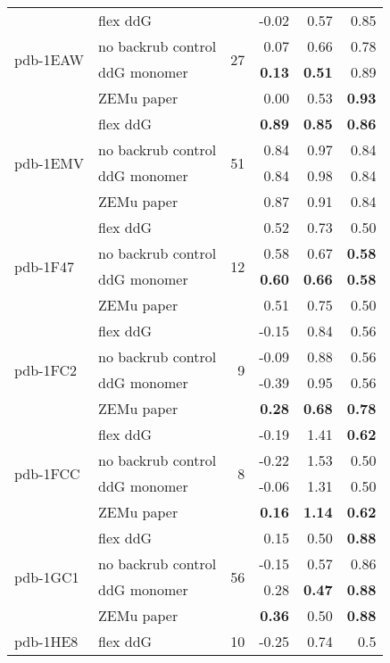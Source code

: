 \begin{longtable}{llrrrr}
 \multirow{ 4}{*}{pdb-1EAW} & flex ddG & \multirow{ 4}{*}{27} & -0.02 & 0.57 & 0.85  \\
 & no backrub control & & 0.07 & 0.66 & 0.78  \\
 & ddG monomer & & \textbf{0.13} & \textbf{0.51} & 0.89  \\
 & ZEMu paper & & 0.00 & 0.53 & \textbf{0.93}  \\
\hline
 \multirow{ 4}{*}{pdb-1EMV} & flex ddG & \multirow{ 4}{*}{51} & \textbf{0.89} & \textbf{0.85} & \textbf{0.86}  \\
 & no backrub control & & 0.84 & 0.97 & 0.84  \\
 & ddG monomer & & 0.84 & 0.98 & 0.84  \\
 & ZEMu paper & & 0.87 & 0.91 & 0.84  \\
\hline
 \multirow{ 4}{*}{pdb-1F47} & flex ddG & \multirow{ 4}{*}{12} & 0.52 & 0.73 & 0.50  \\
 & no backrub control & & 0.58 & 0.67 & \textbf{0.58}  \\
 & ddG monomer & & \textbf{0.60} & \textbf{0.66} & \textbf{0.58}  \\
 & ZEMu paper & & 0.51 & 0.75 & 0.50  \\
\hline
 \multirow{ 4}{*}{pdb-1FC2} & flex ddG & \multirow{ 4}{*}{9} & -0.15 & 0.84 & 0.56  \\
 & no backrub control & & -0.09 & 0.88 & 0.56  \\
 & ddG monomer & & -0.39 & 0.95 & 0.56  \\
 & ZEMu paper & & \textbf{0.28} & \textbf{0.68} & \textbf{0.78}  \\
\hline
 \multirow{ 4}{*}{pdb-1FCC} & flex ddG & \multirow{ 4}{*}{8} & -0.19 & 1.41 & \textbf{0.62}  \\
 & no backrub control & & -0.22 & 1.53 & 0.50  \\
 & ddG monomer & & -0.06 & 1.31 & 0.50  \\
 & ZEMu paper & & \textbf{0.16} & \textbf{1.14} & \textbf{0.62}  \\
\hline
 \multirow{ 4}{*}{pdb-1GC1} & flex ddG & \multirow{ 4}{*}{56} & 0.15 & 0.50 & \textbf{0.88}  \\
 & no backrub control & & -0.15 & 0.57 & 0.86  \\
 & ddG monomer & & 0.28 & \textbf{0.47} & \textbf{0.88}  \\
 & ZEMu paper & & \textbf{0.36} & 0.50 & \textbf{0.88}  \\
\hline
 \multirow{ 4}{*}{pdb-1HE8} & flex ddG & \multirow{ 4}{*}{10} & -0.25 & 0.74 & 0.5  \\

\end{longtable}
